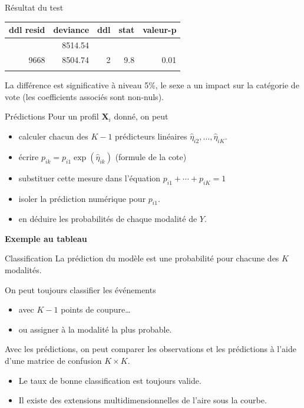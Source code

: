 \documentclass[
  ignorenonframetext,
]{beamer}
\providecommand{\tightlist}{%
  \setlength{\itemsep}{0pt}\setlength{\parskip}{0pt}}\usepackage{longtable,booktabs,array}
\begin{document}
\begin{frame}{Résultat du test}
\label{ruxe9sultat-du-test}
\begin{longtable}[]{@{}rrrrr@{}}
\toprule\noalign{}
ddl resid & deviance & ddl & stat & valeur-p \\
\midrule\noalign{}
\endhead
9670 & 8514.54 & & & \\
9668 & 8504.74 & 2 & 9.8 & 0.01 \\
\bottomrule\noalign{}
\end{longtable}

La différence est significative à niveau 5\%, le sexe a un impact sur la
catégorie de vote (les coefficients associés sont non-nuls).
\end{frame}

\begin{frame}{Prédictions}
\label{pruxe9dictions}
Pour un profil \(\mathbf{X}_i\) donné, on peut

\begin{itemize}
\tightlist
\item
  calculer chacun des \(K-1\) prédicteurs linéaires
  \(\widehat{\eta}_{i2}, \ldots, \widehat{\eta}_{iK}\).
\item
  écrire \(p_{ik} = p_{i1}\exp(\widehat{\eta}_{ik})\) (formule de la
  cote)
\item
  substituer cette mesure dans l'équation \(p_{i1} + \cdots + p_{iK}=1\)
\item
  isoler la prédiction numérique pour \(p_{i1}\).
\item
  en déduire les probabilités de chaque modalité de \(Y\).
\end{itemize}

\textbf{Exemple au tableau}
\end{frame}

\begin{frame}{Classification}
\label{classification}
La prédiction du modèle est une probabilité pour chacune des \(K\)
modalités.

On peut toujours classifier les événements

\begin{itemize}
\tightlist
\item
  avec \(K-1\) points de coupure\ldots{}
\item
  ou assigner à la modalité la plus probable.
\end{itemize}

Avec les prédictions, on peut comparer les observations et les
prédictions à l'aide d'une matrice de confusion \(K \times K\).

\begin{itemize}
\tightlist
\item
  Le taux de bonne classification est toujours valide.
\item
  Il existe des extensions multidimensionnelles de l'aire sous la
  courbe.
\end{itemize}
\end{frame}
\end{document}
